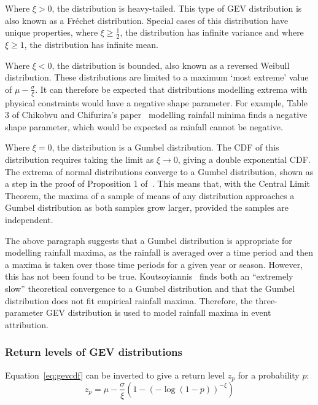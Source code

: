Where $\xi > 0$,
    the distribution is heavy-tailed.
This type of GEV distribution is also known as a Fr\'{e}chet distribution.
Special cases of this distribution have unique properties,
    where $\xi \geq \frac{1}{2}$, the distribution has infinite variance and
    where $\xi \geq 1$, the distribution has infinite mean.

Where $\xi < 0$, the distribution is bounded,
    also known as a reversed Weibull distribution.
These distributions are limited to a maximum `most extreme' value of $\mu - \frac{\sigma}{\xi}$.
It can therefore be expected that distributions modelling extrema with physical constraints would have a negative shape parameter.
For example, Table 3 of Chikobvu and Chifurira's paper~\cite{Chikobvu_2015} modelling rainfall minima finds a negative shape parameter,
    which would be expected as rainfall cannot be negative.

Where $\xi = 0$,
    the distribution is a Gumbel distribution.
The CDF of this distribution requires taking the limit as $\xi \rightarrow 0$,
    giving a double exponential CDF\@.
The extrema of normal distributions converge to a Gumbel distribution,
    shown as a step in the proof of Proposition 1 of~\cite{Bailey_2014}.
This means that, with the Central Limit Theorem,
    the maxima of a sample of means of any distribution approaches a Gumbel distribution as both samples grow larger,
    provided the samples are independent.

The above paragraph suggests that a Gumbel distribution is appropriate for modelling rainfall maxima,
    as the rainfall is averaged over a time period and then a maxima is taken over those time periods for a given year or season.
However, this has not been found to be true.
Koutsoyiannis~\cite{Koutsoyiannis_2003} finds both an ``extremely slow'' theoretical convergence to a Gumbel distribution and
    that the Gumbel distribution does not fit empirical rainfall maxima.
Therefore, the three-parameter GEV distribution is used to model rainfall maxima in event attribution.

\subsubsection{Return levels of GEV distributions}

Equation~\ref{eq:gevcdf} can be inverted to give a return level $z_p$ for a probability $p$:
\begin{equation}\label{eq:gevreturn}
    z_p = \mu - \frac{\sigma}{\xi}\left( 1-\left( -\log\left( 1-p \right) \right)^{-\xi} \right)
\end{equation}


